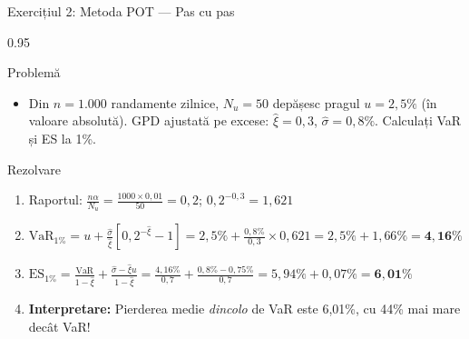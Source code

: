 \documentclass[9pt, aspectratio=169, t]{beamer}
\begin{document}
\begin{frame}{Exercițiul 2: Metoda POT --- Pas cu pas}
    \begin{cminipage}{0.95\textwidth}
\begin{block}{Problemă}
\begin{itemize}\setlength{\itemsep}{0pt}
    \item Din $n = 1{.}000$ randamente zilnice, $N_u = 50$ depășesc pragul $u = 2{,}5\%$ (în valoare absolută). GPD ajustată pe excese: $\hat{\xi} = 0{,}3$, $\hat{\sigma} = 0{,}8\%$. Calculați VaR și ES la 1\%.
\end{itemize}
\end{block}

\begin{exampleblock}{Rezolvare}
\begin{enumerate}\setlength{\itemsep}{0pt}
    \item Raportul: $\frac{n\alpha}{N_u} = \frac{1000 \times 0{,}01}{50} = 0{,}2$; \quad $0{,}2^{-0{,}3} = 1{,}621$
    \item $\text{VaR}_{1\%} = u + \frac{\hat{\sigma}}{\hat{\xi}}[0{,}2^{-\hat{\xi}} - 1] = 2{,}5\% + \frac{0{,}8\%}{0{,}3} \times 0{,}621 = 2{,}5\% + 1{,}66\% = \mathbf{4{,}16\%}$
    \item $\text{ES}_{1\%} = \frac{\text{VaR}}{1-\hat{\xi}} + \frac{\hat{\sigma} - \hat{\xi}u}{1-\hat{\xi}} = \frac{4{,}16\%}{0{,}7} + \frac{0{,}8\% - 0{,}75\%}{0{,}7} = 5{,}94\% + 0{,}07\% = \mathbf{6{,}01\%}$
    \item \textbf{Interpretare:} Pierderea medie \textit{dincolo} de VaR este 6{,}01\%, cu 44\% mai mare decât VaR!
\end{enumerate}
\end{exampleblock}
    \end{cminipage}
\end{frame}
\end{document}
